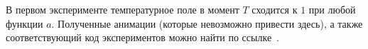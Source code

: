 В первом эксперименте температурное поле в момент $T$ сходится к $1$ при любой функции $a$.
Полученные анимации (которые невозможно привести здесь), а также
соответствующий код экспериментов можно найти по ссылке~\cite{mesenev-github}.



%
